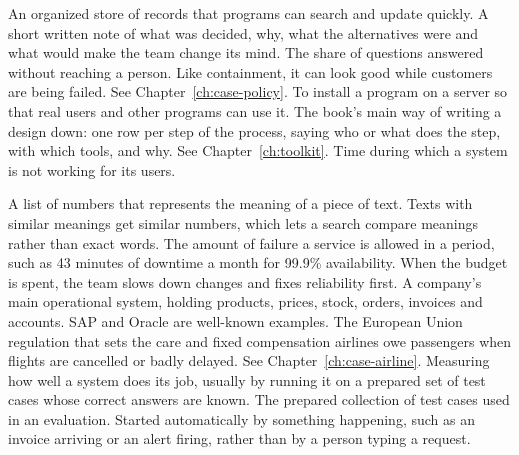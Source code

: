 \begin{description}[style=nextline, leftmargin=1.2em, itemsep=4pt, font=\normalfont\bfseries\sffamily\small]
 An organized store of records that programs can search and update quickly.
 A short written note of what was decided, why, what the alternatives were and what would make the team change its mind.
 The share of questions answered without reaching a person. Like containment, it can look good while customers are being failed. See Chapter~\ref{ch:case-policy}.
 To install a program on a server so that real users and other programs can use it.
 The book's main way of writing a design down: one row per step of the process, saying who or what does the step, with which tools, and why. See Chapter~\ref{ch:toolkit}.
 Time during which a system is not working for its users.

 A list of numbers that represents the meaning of a piece of text. Texts with similar meanings get similar numbers, which lets a search compare meanings rather than exact words.
 The amount of failure a service is allowed in a period, such as 43 minutes of downtime a month for 99.9\% availability. When the budget is spent, the team slows down changes and fixes reliability first.
 A company's main operational system, holding products, prices, stock, orders, invoices and accounts. SAP and Oracle are well-known examples.
 The European Union regulation that sets the care and fixed compensation airlines owe passengers when flights are cancelled or badly delayed. See Chapter~\ref{ch:case-airline}.
 Measuring how well a system does its job, usually by running it on a prepared set of test cases whose correct answers are known.
 The prepared collection of test cases used in an evaluation.
 Started automatically by something happening, such as an invoice arriving or an alert firing, rather than by a person typing a request.


\end{description}
